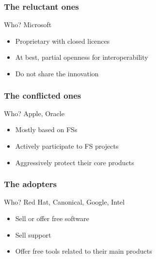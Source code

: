 \documentclass{beamer}
\begin{document}
\begin{frame}

  \frametitle{The reluctant ones}

  \begin{block}{Who?}
    Microsoft
  \end{block}

  \vfill

  \begin{itemize}
    \item{Proprietary with closed licences}
    \item{At best, partial openness for interoperability}
    \item{Do not share the innovation}
  \end{itemize}

\end{frame}

\begin{frame}

  \frametitle{The conflicted ones}

  \begin{block}{Who?}
    Apple, Oracle
  \end{block}

  \vfill

  \begin{itemize}
    \item{Mostly based on FSs}
    \item{Actively participate to FS projects}
    \item{Aggressively protect their core products}
  \end{itemize}

\end{frame}

\begin{frame}

  \frametitle{The adopters}

  \begin{block}{Who?}
    Red Hat, Canonical, Google, Intel
  \end{block}

  \vfill

  \begin{itemize}
    \item{Sell or offer free software}
    \item{Sell support}
    \item{Offer free tools related to their main products}
  \end{itemize}

\end{frame}
\end{document}

